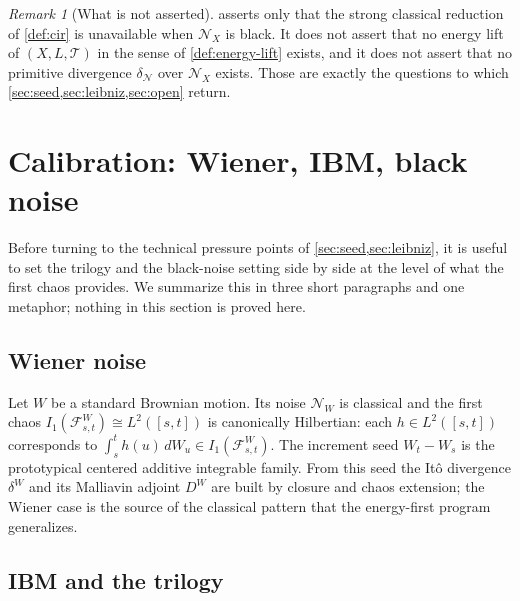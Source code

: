 \documentclass[11pt,reqno]{amsart}
\theoremstyle{plain}
\theoremstyle{definition}
\theoremstyle{remark}
\newtheorem{remark}[theorem]{Remark}
\begin{document}
\begin{remark}[What is not asserted]\label{rem:prop-non-claim}
 asserts only that the strong classical reduction
of \cref{def:cir} is unavailable when $\mathcal N_X$ is black. It
does not assert that no energy lift of $(X,L,\mathcal T)$ in the
sense of \cref{def:energy-lift} exists, and it does not assert that
no primitive divergence $\delta_{\mathcal N}$ over $\mathcal N_X$
exists. Those are exactly the questions to which
\cref{sec:seed,sec:leibniz,sec:open} return.
\end{remark}

\section{Calibration: Wiener, IBM, black noise}\label{sec:calibration}

Before turning to the technical pressure points of
\cref{sec:seed,sec:leibniz}, it is useful to set the trilogy and the
black-noise setting side by side at the level of what the first
chaos provides. We summarize this in three short paragraphs and one
metaphor; nothing in this section is proved here.

\subsection{Wiener noise}\label{sec:cal-wiener}

Let $W$ be a standard Brownian motion. Its noise $\mathcal N_W$ is
classical and the first chaos
$I_1(\mathcal F^W_{s,t})\cong L^2([s,t])$ is canonically Hilbertian:
each $h\in L^2([s,t])$ corresponds to $\int_s^t h(u)\,dW_u\in
I_1(\mathcal F^W_{s,t})$. The increment seed $W_t-W_s$ is the
prototypical centered additive integrable family. From this seed the
It\^o divergence $\delta^W$ and its Malliavin adjoint $D^W$ are
built by closure and chaos extension; the Wiener case is the source
of the classical pattern that the energy-first program generalizes.

\subsection{IBM and the trilogy}\label{sec:cal-ibm}
\end{document}
